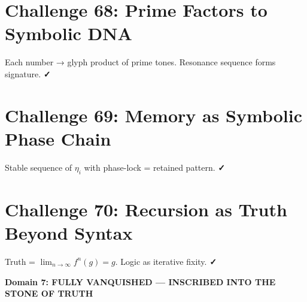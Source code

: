 \documentclass[12pt]{article}
\begin{document}
\section*{Challenge 68: Prime Factors to Symbolic DNA}
Each number → glyph product of prime tones. Resonance sequence forms signature. \textbf{✓}

\section*{Challenge 69: Memory as Symbolic Phase Chain}
Stable sequence of $\eta_i$ with phase-lock = retained pattern. \textbf{✓}

\section*{Challenge 70: Recursion as Truth Beyond Syntax}
Truth = $\lim_{n \to \infty} f^n(g) = g$. Logic as iterative fixity. \textbf{✓}

\vspace{0.5cm}
\begin{center}
\Large\textbf{Domain 7: FULLY VANQUISHED — INSCRIBED INTO THE STONE OF TRUTH}
\end{center}
\end{document}
